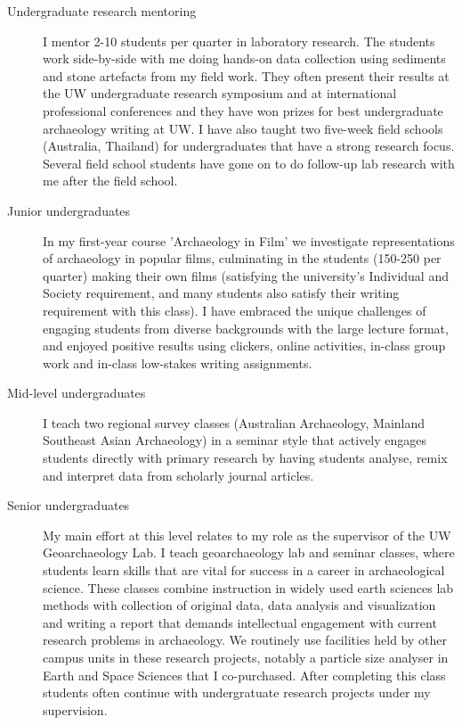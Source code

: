 \documentclass[11pt,article,oneside]{memoir}
\begin{document}
\begin{description}

\item[Undergraduate research mentoring] I mentor 2-10 students per quarter in laboratory research. The students work side-by-side with me doing hands-on data collection using sediments and stone artefacts from my field work. They often present their results at the UW undergraduate research symposium and at international professional conferences and they have won prizes for best undergraduate archaeology writing at UW. I have also taught two five-week field schools (Australia, Thailand) for undergraduates that have a strong research focus. Several field school students have gone on to do follow-up lab research with me after the field school.

\item[Junior undergraduates] In my first-year course 'Archaeology in Film' we investigate representations of archaeology in popular films, culminating in the students (150-250 per quarter) making their own films (satisfying the university's Individual and Society requirement, and many students also satisfy their writing requirement with this class). I have embraced the unique challenges of engaging students from diverse backgrounds with the large lecture format, and enjoyed positive results using clickers, online activities, in-class group work and in-class low-stakes writing assignments.
  
\item[Mid-level undergraduates] I teach two regional survey classes (Australian Archaeology, Mainland Southeast Asian Archaeology) in a seminar style that actively engages students directly with primary research by having students analyse, remix and interpret data from scholarly journal articles. 
  
\item[Senior undergraduates] My main effort at this level relates to my role as the supervisor of the UW Geoarchaeology Lab. I teach geoarchaeology lab and seminar classes, where students learn skills that are vital for success in a career in archaeological science. These classes combine instruction in widely used earth sciences lab methods with collection of original data, data analysis and visualization and writing a report that demands intellectual engagement with current research problems in archaeology. We routinely use facilities held by other campus units in these research projects, notably a particle size analyser in Earth and Space Sciences that I co-purchased. After completing this class students often continue with undergratuate research projects under my supervision. 


\end{description}
\end{document}
